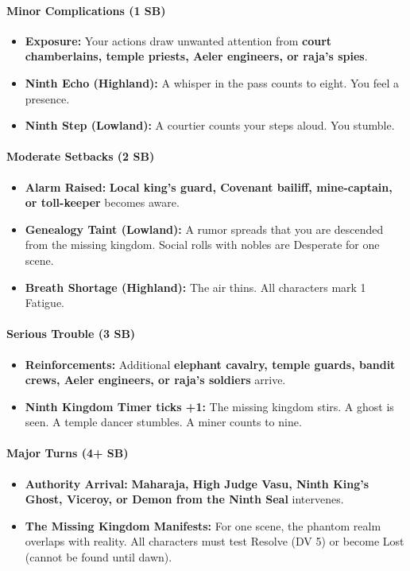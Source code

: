 \paragraph{Minor Complications (1 SB)}
\begin{itemize}
\item \textbf{Exposure:} Your actions draw unwanted attention from \textbf{court chamberlains, temple priests, Aeler engineers, or raja's spies}.
\item \textbf{Ninth Echo (Highland):} A whisper in the pass counts to eight. You feel a presence.
\item \textbf{Ninth Step (Lowland):} A courtier counts your steps aloud. You stumble.
\end{itemize}

\paragraph{Moderate Setbacks (2 SB)}
\begin{itemize}
\item \textbf{Alarm Raised:} \textbf{Local king's guard, Covenant bailiff, mine-captain, or toll-keeper} becomes aware.
\item \textbf{Genealogy Taint (Lowland):} A rumor spreads that you are descended from the missing kingdom. Social rolls with nobles are Desperate for one scene.
\item \textbf{Breath Shortage (Highland):} The air thins. All characters mark 1 Fatigue.
\end{itemize}

\paragraph{Serious Trouble (3 SB)}
\begin{itemize}
\item \textbf{Reinforcements:} Additional \textbf{elephant cavalry, temple guards, bandit crews, Aeler engineers, or raja's soldiers} arrive.
\item \textbf{Ninth Kingdom Timer ticks +1:} The missing kingdom stirs. A ghost is seen. A temple dancer stumbles. A miner counts to nine.
\end{itemize}

\paragraph{Major Turns (4+ SB)}
\begin{itemize}
\item \textbf{Authority Arrival:} \textbf{Maharaja, High Judge Vasu, Ninth King's Ghost, Viceroy, or Demon from the Ninth Seal} intervenes.
\item \textbf{The Missing Kingdom Manifests:} For one scene, the phantom realm overlaps with reality. All characters must test Resolve (DV 5) or become Lost (cannot be found until dawn).
\end{itemize}

